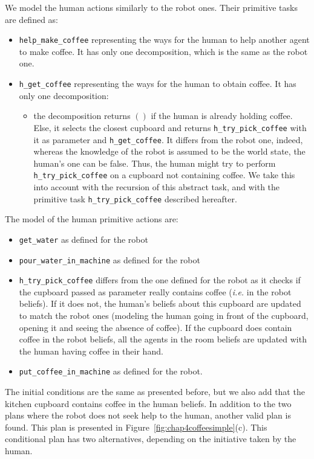 \documentclass[a4paper,11pt,twoside]{StyleThese}
\begin{document}
We model the human actions similarly to the robot ones. Their primitive tasks are defined as:
\begin{itemize}
\item \verb'help_make_coffee' representing the ways for the human to help another agent to make coffee. It has only one decomposition, which is the same as the robot one.
\item \verb'h_get_coffee' representing the ways for the human to obtain coffee. It has only one decomposition:
	\begin{itemize}
	\item the decomposition returns $()$ if the human is already holding coffee. Else, it selects the closest cupboard and returns \verb'h_try_pick_coffee' with it as parameter and \verb'h_get_coffee'. It differs from the robot one, indeed, whereas the knowledge of the robot is assumed to be the world state, the human's one can be false. Thus, the human might try to perform \verb'h_try_pick_coffee' on a cupboard not containing coffee. We take this into account with the recursion of this abstract task, and with the primitive task \verb'h_try_pick_coffee' described hereafter.
	\end{itemize}
\end{itemize}

The model of the human primitive actions are:
\begin{itemize}
\item \verb'get_water' as defined for the robot
\item \verb'pour_water_in_machine' as defined for the robot
\item \verb'h_try_pick_coffee' differs from the one defined for the robot as it checks if the cupboard passed as parameter really contains coffee (\textit{i.e.} in the robot beliefs). If it does not, the human's beliefs about this cupboard are updated to match the robot ones (modeling the human going in front of the cupboard, opening it and seeing the absence of coffee). If the cupboard does contain coffee in the robot beliefs, all the agents in the room beliefs are updated with the human having coffee in their hand.
\item \verb'put_coffee_in_machine' as defined for the robot.
\end{itemize}

The initial conditions are the same as presented before, but we also add that the kitchen cupboard contains coffee in the human beliefs. In addition to the two plans where the robot does not seek help to the human, another valid plan is found. This plan is presented in Figure~\ref{fig:chap4coffeesimple}(c). This conditional plan has two alternatives, depending on the initiative taken by the human.
\end{document}
